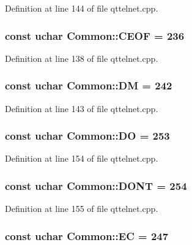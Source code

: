 Definition at line 144 of file qttelnet.cpp.

\hypertarget{namespaceCommon_ac3b3977f247eb02cba4a958c4248954c}{
\subsubsection[{CEOF}]{\setlength{\rightskip}{0pt plus 5cm}const uchar {\bf Common::CEOF} = 236}}
\label{namespaceCommon_ac3b3977f247eb02cba4a958c4248954c}


Definition at line 138 of file qttelnet.cpp.

\hypertarget{namespaceCommon_adc4c0767413b15f49984f376b55e70f9}{
\subsubsection[{DM}]{\setlength{\rightskip}{0pt plus 5cm}const uchar {\bf Common::DM} = 242}}
\label{namespaceCommon_adc4c0767413b15f49984f376b55e70f9}


Definition at line 143 of file qttelnet.cpp.

\hypertarget{namespaceCommon_a680f5aa7bebdbbee557ce11edb635cb3}{
\subsubsection[{DO}]{\setlength{\rightskip}{0pt plus 5cm}const uchar {\bf Common::DO} = 253}}
\label{namespaceCommon_a680f5aa7bebdbbee557ce11edb635cb3}


Definition at line 154 of file qttelnet.cpp.

\hypertarget{namespaceCommon_ab8ecba25425f3bf116b3d82b48e546b0}{
\subsubsection[{DONT}]{\setlength{\rightskip}{0pt plus 5cm}const uchar {\bf Common::DONT} = 254}}
\label{namespaceCommon_ab8ecba25425f3bf116b3d82b48e546b0}


Definition at line 155 of file qttelnet.cpp.

\hypertarget{namespaceCommon_a52db9637074843c1cfeac037f0156946}{
\subsubsection[{EC}]{\setlength{\rightskip}{0pt plus 5cm}const uchar {\bf Common::EC} = 247}}
\label{namespaceCommon_a52db9637074843c1cfeac037f0156946}


